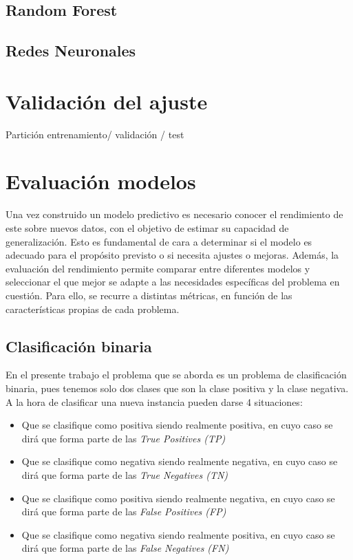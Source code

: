 \documentclass[12pt,a4paper,]{book}
\numberwithin{dummy}{section}
\theoremstyle{ocrenumbox}
\theoremstyle{blacknumex}
\theoremstyle{blacknumbox}
\theoremstyle{ocrenum}
\theoremstyle{ocrenum}
\begin{document}
\hypertarget{random-forest}{%
\subsection{Random Forest}\label{random-forest}}

\hypertarget{redes-neuronales}{%
\subsection{Redes Neuronales}\label{redes-neuronales}}

\hypertarget{validaciuxf3n-del-ajuste}{%
\section{Validación del ajuste}\label{validaciuxf3n-del-ajuste}}

Partición entrenamiento/ validación / test

\hypertarget{evaluaciuxf3n-modelos}{%
\section{Evaluación modelos}\label{evaluaciuxf3n-modelos}}

Una vez construido un modelo predictivo es necesario conocer el
rendimiento de este sobre nuevos datos, con el objetivo de estimar su
capacidad de generalización. Esto es fundamental de cara a determinar si
el modelo es adecuado para el propósito previsto o si necesita ajustes o
mejoras. Además, la evaluación del rendimiento permite comparar entre
diferentes modelos y seleccionar el que mejor se adapte a las
necesidades específicas del problema en cuestión. Para ello, se recurre
a distintas métricas, en función de las características propias de cada
problema.

\hypertarget{clasificaciuxf3n-binaria}{%
\subsection{Clasificación binaria}\label{clasificaciuxf3n-binaria}}

En el presente trabajo el problema que se aborda es un problema de
clasificación binaria, pues tenemos solo dos clases que son la clase
positiva y la clase negativa. A la hora de clasificar una nueva
instancia pueden darse 4 situaciones:

\begin{itemize}
\item
  Que se clasifique como positiva siendo realmente positiva, en cuyo
  caso se dirá que forma parte de las \emph{True Positives (TP)}
\item
  Que se clasifique como negativa siendo realmente negativa, en cuyo
  caso se dirá que forma parte de las \emph{True Negatives (TN)}
\item
  Que se clasifique como positiva siendo realmente negativa, en cuyo
  caso se dirá que forma parte de las \emph{False Positives (FP)}
\item
  Que se clasifique como negativa siendo realmente positiva, en cuyo
  caso se dirá que forma parte de las \emph{False Negatives (FN)}
\end{itemize}
\end{document}
